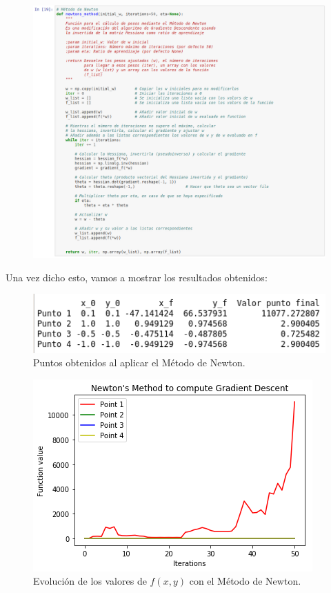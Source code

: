 \documentclass[11pt,a4paper]{article}
\begin{document}
\begin{figure}[H]
\centering
\includegraphics[scale=0.4]{img/nm_implementation.png}
\end{figure}

Una vez dicho esto, vamos a mostrar los resultados obtenidos:

\begin{figure}[H]
\centering
\includegraphics[scale=0.6]{img/nm_points.png}
\caption{Puntos obtenidos al aplicar el Método de Newton.}
\end{figure}

\begin{figure}[H]
\centering
\includegraphics[scale=0.8]{img/nm_cmp.png}
\caption{Evolución de los valores de $f(x, y)$ con el Método de Newton.}
\end{figure}
\end{document}
